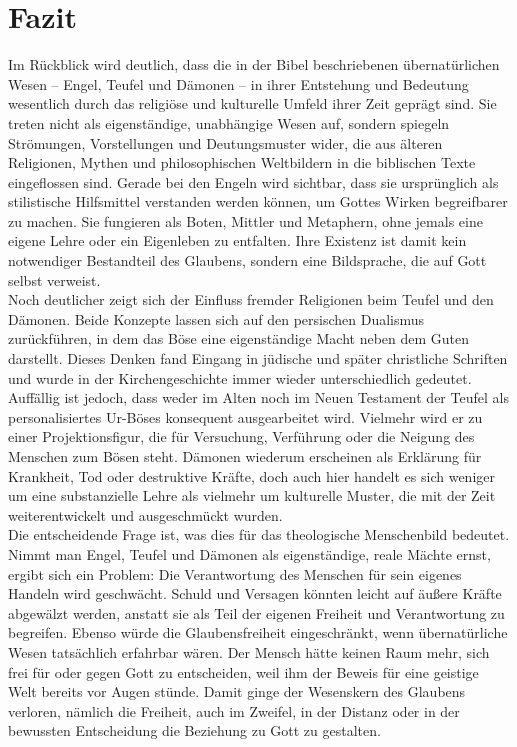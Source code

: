 \section{Fazit}
Im Rückblick wird deutlich, dass die in der Bibel beschriebenen übernatürlichen Wesen – Engel, Teufel und Dämonen – in ihrer Entstehung und Bedeutung wesentlich durch das religiöse und kulturelle Umfeld ihrer Zeit geprägt sind. Sie treten nicht als eigenständige, unabhängige Wesen auf, sondern spiegeln Strömungen, Vorstellungen und Deutungsmuster wider, die aus älteren Religionen, Mythen und philosophischen Weltbildern in die biblischen Texte eingeflossen sind. Gerade bei den Engeln wird sichtbar, dass sie ursprünglich als stilistische Hilfsmittel verstanden werden können, um Gottes Wirken begreifbarer zu machen. Sie fungieren als Boten, Mittler und Metaphern, ohne jemals eine eigene Lehre oder ein Eigenleben zu entfalten. Ihre Existenz ist damit kein notwendiger Bestandteil des Glaubens, sondern eine Bildsprache, die auf Gott selbst verweist.\\

Noch deutlicher zeigt sich der Einfluss fremder Religionen beim Teufel und den Dämonen. Beide Konzepte lassen sich auf den persischen Dualismus zurückführen, in dem das Böse eine eigenständige Macht neben dem Guten darstellt. Dieses Denken fand Eingang in jüdische und später christliche Schriften und wurde in der Kirchengeschichte immer wieder unterschiedlich gedeutet. Auffällig ist jedoch, dass weder im Alten noch im Neuen Testament der Teufel als personalisiertes Ur-Böses konsequent ausgearbeitet wird. Vielmehr wird er zu einer Projektionsfigur, die für Versuchung, Verführung oder die Neigung des Menschen zum Bösen steht. Dämonen wiederum erscheinen als Erklärung für Krankheit, Tod oder destruktive Kräfte, doch auch hier handelt es sich weniger um eine substanzielle Lehre als vielmehr um kulturelle Muster, die mit der Zeit weiterentwickelt und ausgeschmückt wurden.\\

Die entscheidende Frage ist, was dies für das theologische Menschenbild bedeutet. Nimmt man Engel, Teufel und Dämonen als eigenständige, reale Mächte ernst, ergibt sich ein Problem: Die Verantwortung des Menschen für sein eigenes Handeln wird geschwächt. Schuld und Versagen könnten leicht auf äußere Kräfte abgewälzt werden, anstatt sie als Teil der eigenen Freiheit und Verantwortung zu begreifen. Ebenso würde die Glaubensfreiheit eingeschränkt, wenn übernatürliche Wesen tatsächlich erfahrbar wären. Der Mensch hätte keinen Raum mehr, sich frei für oder gegen Gott zu entscheiden, weil ihm der Beweis für eine geistige Welt bereits vor Augen stünde. Damit ginge der Wesenskern des Glaubens verloren, nämlich die Freiheit, auch im Zweifel, in der Distanz oder in der bewussten Entscheidung die Beziehung zu Gott zu gestalten.\\

